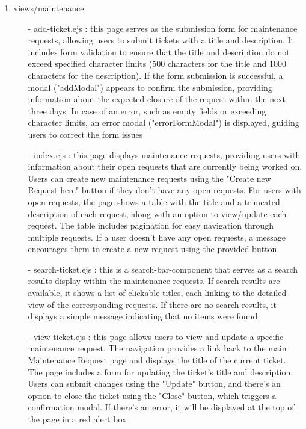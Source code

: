 \documentclass[conference]{IEEEtran}
\begin{document}
\begin{enumerate}
\begin{enumerate}
        \item views/maintenance
        \begin{itemize}
            \item[-] add-ticket.ejs : this page serves as the submission form for maintenance requests, allowing users to submit tickets with a title and description. It includes form validation to ensure that the title and description do not exceed specified character limits (500 characters for the title and 1000 characters for the description). If the form submission is successful, a modal ("addModal") appears to confirm the submission, providing information about the expected closure of the request within the next three days. In case of an error, such as empty fields or exceeding character limits, an error modal ("errorFormModal") is displayed, guiding users to correct the form issues
            \item[-] index.ejs : this page displays maintenance requests, providing users with information about their open requests that are currently being worked on. Users can create new maintenance requests using the "Create new Request here" button if they don't have any open requests. For users with open requests, the page shows a table with the title and a truncated description of each request, along with an option to view/update each request. The table includes pagination for easy navigation through multiple requests. If a user doesn't have any open requests, a message encourages them to create a new request using the provided button
            \item[-] search-ticket.ejs : this is a search-bar-component that serves as a search results display within the maintenance requests. If search results are available, it shows a list of clickable titles, each linking to the detailed view of the corresponding requests. If there are no search results, it displays a simple message indicating that no items were found
            \item[-] view-ticket.ejs : this page allows users to view and update a specific maintenance request. The navigation provides a link back to the main Maintenance Request page and displays the title of the current ticket. The page includes a form for updating the ticket's title and description. Users can submit changes using the "Update" button, and there's an option to close the ticket using the "Close" button, which triggers a confirmation modal. If there's an error, it will be displayed at the top of the page in a red alert box
        \end{itemize}


\end{enumerate}
\end{enumerate}
\end{document}
